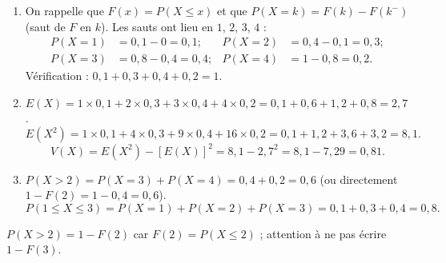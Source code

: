 \documentclass[11pt]{article}
\begin{document}
\begin{corrige}
\begin{enumerate}
\item On rappelle que $F(x)=P(X\le x)$ et que $P(X=k)=F(k)-F(k^-)$ (saut de $F$ en $k$). Les sauts ont lieu en $1$, $2$, $3$, $4$ :
\begin{align*}
P(X=1)&=0{,}1-0=0{,}1 ; & P(X=2)&=0{,}4-0{,}1=0{,}3 ;\\
P(X=3)&=0{,}8-0{,}4=0{,}4 ; & P(X=4)&=1-0{,}8=0{,}2.
\end{align*}
Vérification : $0{,}1+0{,}3+0{,}4+0{,}2=1$.
\item $E(X)=1\times 0{,}1+2\times 0{,}3+3\times 0{,}4+4\times 0{,}2=0{,}1+0{,}6+1{,}2+0{,}8=2{,}7$.
\[E(X^2)=1\times 0{,}1+4\times 0{,}3+9\times 0{,}4+16\times 0{,}2=0{,}1+1{,}2+3{,}6+3{,}2=8{,}1.\]
\[V(X)=E(X^2)-[E(X)]^2=8{,}1-2{,}7^2=8{,}1-7{,}29=0{,}81.\]
\item $P(X>2)=P(X=3)+P(X=4)=0{,}4+0{,}2=0{,}6$ (ou directement $1-F(2)=1-0{,}4=0{,}6$).
\[P(1\le X\le 3)=P(X=1)+P(X=2)+P(X=3)=0{,}1+0{,}3+0{,}4=0{,}8.\]
\end{enumerate}
\begin{attention}
$P(X>2)=1-F(2)$ car $F(2)=P(X\le 2)$ ; attention à ne pas écrire $1-F(3)$.
\end{attention}
\end{corrige}
\end{document}
